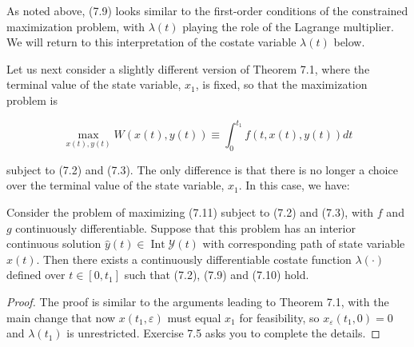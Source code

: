 \documentclass[\topdir/lecture_notes.tex]{subfiles}
\begin{document}
As noted above, (7.9) looks similar to the first-order conditions of the constrained maximization problem, with $\lambda(t)$ playing the role of the Lagrange multiplier. We will return to this interpretation of the costate variable $\lambda(t)$ below.

Let us next consider a slightly different version of Theorem 7.1, where the terminal value of the state variable, $x_{1}$, is fixed, so that the maximization problem is

\[
\max _{x(t), y(t)} W(x(t), y(t)) \equiv \int_{0}^{t_{1}} f(t, x(t), y(t)) d t
\]

subject to (7.2) and (7.3). The only difference is that there is no longer a choice over the terminal value of the state variable, $x_{1}$. In this case, we have:

\begin{theorem}
Consider the problem of maximizing (7.11) subject to (7.2) and (7.3), with $f$ and $g$ continuously differentiable. Suppose that this problem has an interior continuous solution $\hat{y}(t) \in \operatorname{Int} \mathcal{Y}(t)$ with corresponding path of state variable $\hat{x}(t)$. Then there exists a continuously differentiable costate function $\lambda(\cdot)$ defined over $t \in \left[0, t_1\right]$ such that (7.2), (7.9) and (7.10) hold.
\end{theorem}
\begin{proof}
The proof is similar to the arguments leading to Theorem 7.1, with the main change that now $x\left(t_{1}, \varepsilon\right)$ must equal $x_{1}$ for feasibility, so $x_{\varepsilon}\left(t_{1}, 0\right)=0$ and $\lambda\left(t_{1}\right)$ is unrestricted. Exercise 7.5 asks you to complete the details.
\end{proof}
\end{document}
